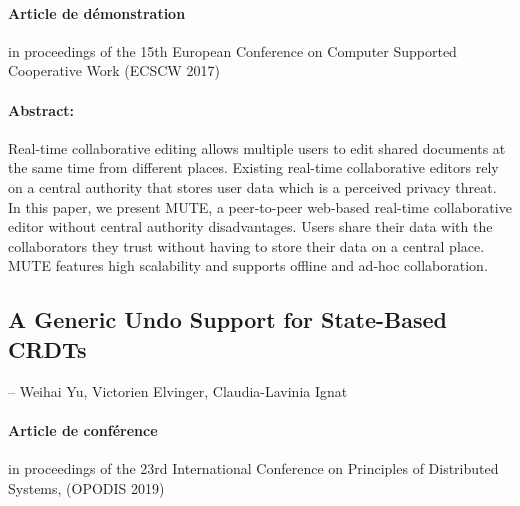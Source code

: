 \begin{otherlanguage}{english}
\paragraph{Article de démonstration} in proceedings of the 15th European Conference on Computer Supported Cooperative Work ({ECSCW} 2017)

\paragraph{Abstract:} Real-time collaborative editing allows multiple users to edit shared documents at the same time from different places. Existing real-time collaborative editors rely on a central authority that stores user data which is a perceived privacy threat. In this paper, we present \acf{MUTE}, a peer-to-peer web-based real-time collaborative editor without central authority disadvantages. Users share their data with the collaborators they trust without having to store their data on a central place. MUTE features high scalability and supports offline and ad-hoc collaboration.


\clearpage

\subsection*{A Generic Undo Support for State-Based CRDTs \autocite{2019_yu_genericundo}}

-- Weihai Yu, Victorien Elvinger, Claudia-Lavinia Ignat

\paragraph{Article de conférence} in proceedings of the 23rd International Conference on Principles of Distributed Systems, ({OPODIS} 2019)


\end{otherlanguage}
